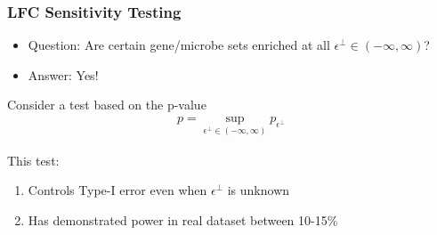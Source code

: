 \begin{frame}
  \frametitle{LFC Sensitivity Testing}

  \begin{itemize}
  \item Question: Are certain gene/microbe sets enriched at all \(\epsilon^\perp \in (-\infty, \infty)\)?
  \item Answer: Yes!
  \end{itemize}

  \vspace{15px}
  
  Consider a test based on the p-value
  \begin{align*}
    p = \sup_{\epsilon^\perp \in (-\infty, \infty)} p_{\epsilon^\perp}
  \end{align*}

  This test:
  \begin{enumerate}
    \item Controls Type-I error even when \(\epsilon^\perp\) is unknown
    \item Has demonstrated power in real dataset between 10-15\% 
  \end{enumerate}
\end{frame}


